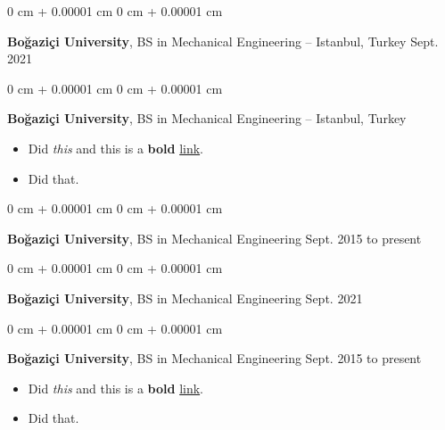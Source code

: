 \documentclass[10pt, letterpaper]{article}
\newenvironment{highlights}{
    \begin{itemize}[
        topsep=0.10 cm,
        parsep=0.10 cm,
        partopsep=0pt,
        itemsep=0pt,
        leftmargin=0 cm + 10pt
    ]
}{
    \end{itemize}
        
    \vspace{-0.20cm}
} %
\newenvironment{onecolentry}{
    \begin{adjustwidth}{
        0 cm + 0.00001 cm
    }{
        0 cm + 0.00001 cm
    }
}{
    \end{adjustwidth}
} %
\begin{document}
        \begin{onecolentry}
            \textbf{Boğaziçi University}, BS in Mechanical Engineering -- Istanbul, Turkey \hfill Sept. 2021
        \end{onecolentry}

        \vspace{0.1 cm}

        \begin{onecolentry}
            \textbf{Boğaziçi University}, BS in Mechanical Engineering -- Istanbul, Turkey \hfill 
            \begin{highlights}
                \item Did \textit{this} and this is a \textbf{bold} \href{https://example.com}{link}.
                \item Did that.
            \end{highlights}
        \end{onecolentry}

        \vspace{0.1 cm}

        \begin{onecolentry}
            \textbf{Boğaziçi University}, BS in Mechanical Engineering \hfill Sept. 2015 to present
        \end{onecolentry}

        \vspace{0.1 cm}

        \begin{onecolentry}
            \textbf{Boğaziçi University}, BS in Mechanical Engineering \hfill Sept. 2021
        \end{onecolentry}

        \vspace{0.1 cm}

        \begin{onecolentry}
            \textbf{Boğaziçi University}, BS in Mechanical Engineering \hfill Sept. 2015 to present
            \begin{highlights}
                \item Did \textit{this} and this is a \textbf{bold} \href{https://example.com}{link}.
                \item Did that.
            \end{highlights}
        \end{onecolentry}

        \vspace{0.1 cm}
\end{document}
